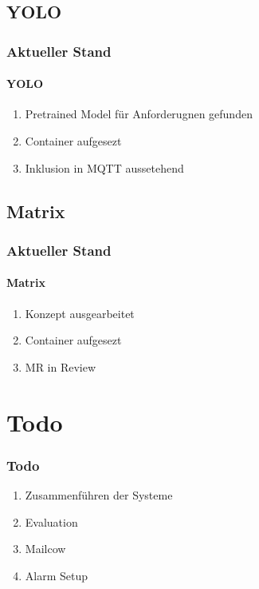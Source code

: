 \documentclass[]{beamer}
\begin{document}
\subsection{YOLO}
\begin{frame}
\frametitle{Aktueller Stand}
\framesubtitle{YOLO}
\begin{enumerate}
    \item Pretrained Model für Anforderugnen gefunden 
    \item Container aufgesezt
    \item Inklusion in MQTT aussetehend
\end{enumerate}

\end{frame}


\subsection{Matrix}
\begin{frame}
\frametitle{Aktueller Stand}
\framesubtitle{Matrix}
\begin{enumerate}
    \item Konzept ausgearbeitet
    \item Container aufgesezt
    \item MR in Review
\end{enumerate}
\end{frame}


\section{Todo}
\begin{frame}
\frametitle{Todo}
\begin{enumerate}
    \item Zusammenführen der Systeme
    \item Evaluation
    \item Mailcow
    \item Alarm Setup
\end{enumerate}
\end{frame}
\end{document}

